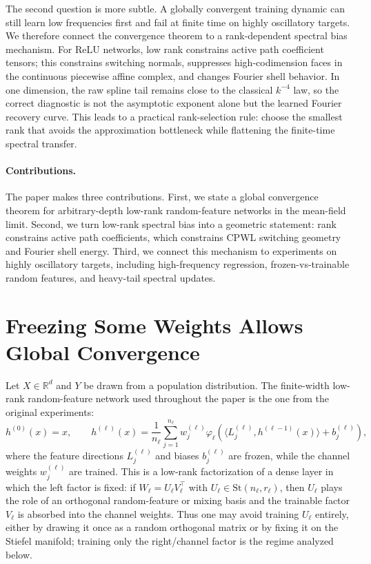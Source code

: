 \documentclass{article}
\newcommand{\R}{\mathbb{R}}
\begin{document}
The second question is more subtle. A globally convergent training dynamic can still learn low frequencies first and fail at finite time on highly oscillatory targets. We therefore connect the convergence theorem to a rank-dependent spectral bias mechanism. For ReLU networks, low rank constrains active path coefficient tensors; this constrains switching normals, suppresses high-codimension faces in the continuous piecewise affine complex, and changes Fourier shell behavior. In one dimension, the raw spline tail remains close to the classical $k^{-4}$ law, so the correct diagnostic is not the asymptotic exponent alone but the learned Fourier recovery curve. This leads to a practical rank-selection rule: choose the smallest rank that avoids the approximation bottleneck while flattening the finite-time spectral transfer.

\paragraph{Contributions.}
The paper makes three contributions. First, we state a global convergence theorem for arbitrary-depth low-rank random-feature networks in the mean-field limit. Second, we turn low-rank spectral bias into a geometric statement: rank constrains active path coefficients, which constrains CPWL switching geometry and Fourier shell energy. Third, we connect this mechanism to experiments on highly oscillatory targets, including high-frequency regression, frozen-vs-trainable random features, and heavy-tail spectral updates.

\section{Freezing Some Weights Allows Global Convergence}
\label{sec:model}

Let $X\in\R^d$ and $Y$ be drawn from a population distribution. The finite-width low-rank random-feature network used throughout the paper is the one from the original experiments:
\begin{equation}
h^{(0)}(x)=x,\qquad
h^{(\ell)}(x)=
\frac1{n_\ell}\sum_{j=1}^{n_\ell}
w_j^{(\ell)}
\varphi_\ell\!\left(
\langle L_j^{(\ell)},h^{(\ell-1)}(x)\rangle+b_j^{(\ell)}
\right),
\label{eq:finite-rflr}
\end{equation}
where the feature directions $L_j^{(\ell)}$ and biases $b_j^{(\ell)}$ are frozen, while the channel weights $w_j^{(\ell)}$ are trained. This is a low-rank factorization of a dense layer in which the left factor is fixed: if $W_\ell=U_\ell V_\ell^\top$ with $U_\ell\in\mathrm{St}(n_\ell,r_\ell)$, then $U_\ell$ plays the role of an orthogonal random-feature or mixing basis and the trainable factor $V_\ell$ is absorbed into the channel weights. Thus one may avoid training $U_\ell$ entirely, either by drawing it once as a random orthogonal matrix or by fixing it on the Stiefel manifold; training only the right/channel factor is the regime analyzed below.
\end{document}
